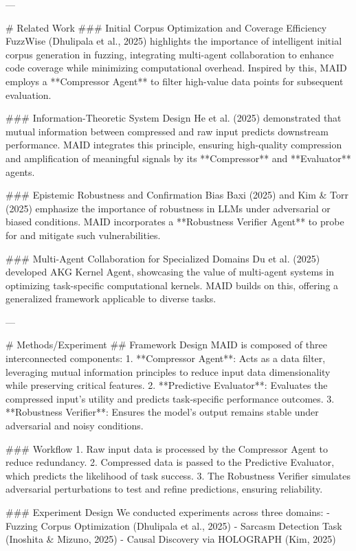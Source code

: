 ---

# Related Work  
### Initial Corpus Optimization and Coverage Efficiency  
FuzzWise (Dhulipala et al., 2025) highlights the importance of intelligent initial corpus generation in fuzzing, integrating multi-agent collaboration to enhance code coverage while minimizing computational overhead. Inspired by this, MAID employs a **Compressor Agent** to filter high-value data points for subsequent evaluation.  

### Information-Theoretic System Design  
He et al. (2025) demonstrated that mutual information between compressed and raw input predicts downstream performance. MAID integrates this principle, ensuring high-quality compression and amplification of meaningful signals by its **Compressor** and **Evaluator** agents.  

### Epistemic Robustness and Confirmation Bias  
Baxi (2025) and Kim & Torr (2025) emphasize the importance of robustness in LLMs under adversarial or biased conditions. MAID incorporates a **Robustness Verifier Agent** to probe for and mitigate such vulnerabilities.  

### Multi-Agent Collaboration for Specialized Domains  
Du et al. (2025) developed AKG Kernel Agent, showcasing the value of multi-agent systems in optimizing task-specific computational kernels. MAID builds on this, offering a generalized framework applicable to diverse tasks.  

---

# Methods/Experiment  
## Framework Design  
MAID is composed of three interconnected components:  
1. **Compressor Agent**: Acts as a data filter, leveraging mutual information principles to reduce input data dimensionality while preserving critical features.  
2. **Predictive Evaluator**: Evaluates the compressed input's utility and predicts task-specific performance outcomes.  
3. **Robustness Verifier**: Ensures the model's output remains stable under adversarial and noisy conditions.  

### Workflow  
1. Raw input data is processed by the Compressor Agent to reduce redundancy.  
2. Compressed data is passed to the Predictive Evaluator, which predicts the likelihood of task success.  
3. The Robustness Verifier simulates adversarial perturbations to test and refine predictions, ensuring reliability.  

### Experiment Design  
We conducted experiments across three domains:  
- Fuzzing Corpus Optimization (Dhulipala et al., 2025)  
- Sarcasm Detection Task (Inoshita & Mizuno, 2025)  
- Causal Discovery via HOLOGRAPH (Kim, 2025)  

